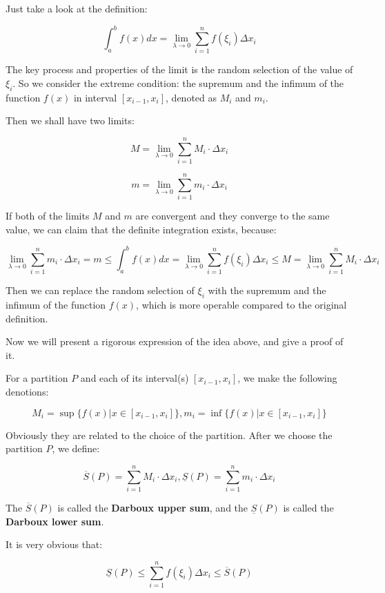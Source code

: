 Just take a look at the definition: 

\[\int_{a}^{b} f(x) dx =\lim_{\lambda \to 0} \sum_{i=1}^{n} f(\xi_i)\Delta x_i\]

The key process and properties of the limit is the random selection of the value of $\xi_i$. So we consider the extreme condition: the supremum and the infimum of the function $f(x)$ in interval $[x_{i-1},x_i]$, denoted as $M_i$ and $m_i$.

Then we shall have two limits:

\[M = \lim_{\lambda \to 0} \sum_{i=1}^{n}M_i \cdot \Delta x_i\]

\[m = \lim_{\lambda \to 0} \sum_{i=1}^{n}m_i \cdot \Delta x_i\]

If both of the limits $M$ and $m$ are convergent and they converge to the same value, we can claim that the definite integration exists, because:

\[\lim_{\lambda \to 0} \sum_{i=1}^{n}m_i \cdot \Delta x_i = m \leq \int_{a}^{b} f(x) dx =\lim_{\lambda \to 0} \sum_{i=1}^{n} f(\xi_i)\Delta x_i \leq M = \lim_{\lambda \to 0} \sum_{i=1}^{n}M_i \cdot \Delta x_i\]

Then we can replace the random selection of $\xi_i$ with the supremum and the infimum of the function $f(x)$, which is more operable compared to the original definition.

Now we will present a rigorous expression of the idea above, and give a proof of it.

\begin{definition}
For a partition $P$ and each of its interval(s) $[x_{i-1},x_i]$, we make the following denotions:

\[
M_i = \sup\{f(x)|x \in [x_{i-1},x_i]\}, m_i = \inf\{f(x)|x \in [x_{i-1},x_i]\}
\]

Obviously they are related to the choice of the partition. After we choose the partition $P$, we define:

\[
\overline{S}(P) = \sum_{i=1}^{n} M_i \cdot \Delta x_i , \underline{S}(P) = \sum_{i=1}^{n} m_i \cdot \Delta x_i
\]

The $\overline{S}(P)$ is called the \textbf{Darboux upper sum}, and the $\underline{S}(P)$ is called the \textbf{Darboux lower sum}.
\end{definition}

It is very obvious that:

\[
\underline{S}(P) \leq \sum_{i=1}^{n} f(\xi_i) \Delta x_i \leq \overline{S}(P)
\]

